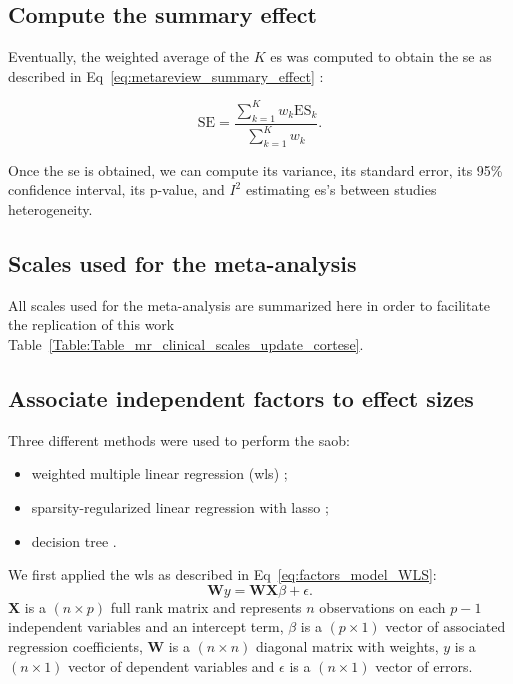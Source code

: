 \documentclass[12pt,a4paper,english]{article}
\begin{document}
\subsection{Compute the summary effect}

\noindent Eventually, the weighted average of the $K$ \gls{es} was computed to obtain the \gls{se} as described in 
Eq~\ref{eq:metareview_summary_effect} \citep{Borenstein2009}:

\begin{equation}
\label{eq:metareview_summary_effect}
\text{SE} = \frac{\sum_{k=1}^{K} w_k \text{ES}_k} {\sum_{k=1}^{K} w_k}.
\end{equation} 

\noindent Once the \gls{se}  is obtained, we can compute its variance, its standard error, its 95\% confidence interval, its p-value, 
and $I^2$ estimating \gls{es}'s between studies heterogeneity. 

\subsection{Scales used for the meta-analysis}

All scales used for the meta-analysis are summarized here in order to facilitate the replication of this work 
Table~\ref{Table:Table_mr_clinical_scales_update_cortese}.

\subsection{Associate independent factors to effect sizes}

Three different methods were used to perform the \gls{saob}:
\begin{itemize}
	\item weighted multiple linear regression (\gls{wls}) \citep{Montgomery2012}; 
	\item sparsity-regularized linear regression with \gls{lasso} \citep{Tibshirani1996};
	\item decision tree \citep{Quinlan1986}.
\end{itemize}

\noindent We first applied the \gls{wls} as described in Eq~\ref{eq:factors_model_WLS}: 
\begin{equation}
\label{eq:factors_model_WLS}
\textbf{W}y = \textbf{WX}\beta + \epsilon.
\end{equation}
\noindent $\textbf{X}$ is a $(n \times p)$ full rank matrix and represents $n$ observations on each $p-1$ independent variables and an 
intercept term, $\beta$ is a $(p \times 1)$ vector of associated regression coefficients, $\textbf{W}$ is a $(n \times n)$ diagonal 
matrix with weights, $y$ is a $(n \times 1)$ vector of dependent variables and $\epsilon$ is a $(n \times 1)$ vector of errors.
\end{document}
